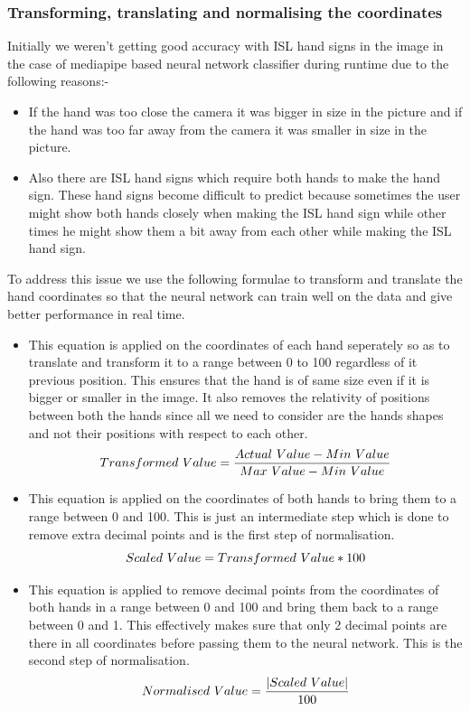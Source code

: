\documentclass[12pt,a4paper]{report}
\begin{document}
\subsubsection{Transforming, translating and normalising the coordinates}
Initially we weren't getting good accuracy with ISL hand signs in the image in the case of mediapipe based neural network classifier during runtime due to the following reasons:-
\begin{itemize}
	\item If the hand was too close the camera it was bigger in size in the picture and if the hand was too far away from the camera it was smaller in size in the picture.
	\item Also there are ISL hand signs which require both hands to make the hand sign. These hand signs become difficult to predict because sometimes the user might show both hands closely when making the ISL hand sign while other times he might show them a bit away from each other while making the ISL hand sign.
\end{itemize}
To address this issue we use the following formulae to transform and translate the hand coordinates so that the neural network can train well on the data and give better performance in real time.
\begin{itemize}
	\item This equation is applied on the coordinates of each hand seperately so as to translate and transform it to a range between 0 to 100 regardless of it previous position. This ensures that the hand is of same size even if it is bigger or smaller in the image. It also removes the relativity of positions between both the hands since all we need to consider are the hands shapes and not their positions with respect to each other.
	      \begin{equation}
		      Transformed\ Value = \frac{Actual\ Value - Min\ Value}{Max\ Value - Min\ Value} \notag
	      \end{equation}
	\item This equation is applied on the coordinates of both hands to bring them to a range between 0 and 100. This is just an intermediate step which is done to remove extra decimal points and is the first step of normalisation.
	      \begin{equation}
		      Scaled\ Value = Transformed\ Value * 100 \notag
	      \end{equation}
	\item This equation is applied to remove decimal points from the coordinates of both hands in a range between 0 and 100 and bring them back to a range between 0 and 1. This effectively makes sure that only 2 decimal points are there in all coordinates before passing them to the neural network. This is the second step of normalisation.
	      \begin{equation}
		      Normalised\ Value = \frac{|Scaled\ Value|}{100} \notag
	      \end{equation}
\end{itemize}
\end{document}
